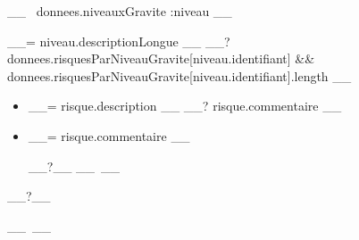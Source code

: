 \documentclass[9pt, a4paper]{article}
\begin{document}
  __~ donnees.niveauxGravite :niveau __
    \begin{tcolorbox}[breakable, colback=white, colframe=lisere, boxrule=1px, bottom=20pt, top=20pt]
      \vspace{-31pt}
      \nopagebreak[4]\singlespacing\textcolor{gris}{__= niveau.descriptionLongue __}
      __? donnees.risquesParNiveauGravite[niveau.identifiant] && donnees.risquesParNiveauGravite[niveau.identifiant].length __
        \begin{itemize}[leftmargin=1.5em]
          __~ donnees.risquesParNiveauGravite[niveau.identifiant] :risque __%
            \item[\textcolor{__= niveau.couleur __}{\textbullet}]
              \vskip 2mm
              __= risque.description __
              __? risque.commentaire __
                \nopagebreak[4]\item[]
                \parbox{\linewidth}{\textcolor{gris}{__= risque.commentaire __}}
                \vskip 3mm
              __?__%
          __~__%
        \end{itemize}
      __?__
    \end{tcolorbox}
    \vskip 5mm
  __~__
\end{document}
